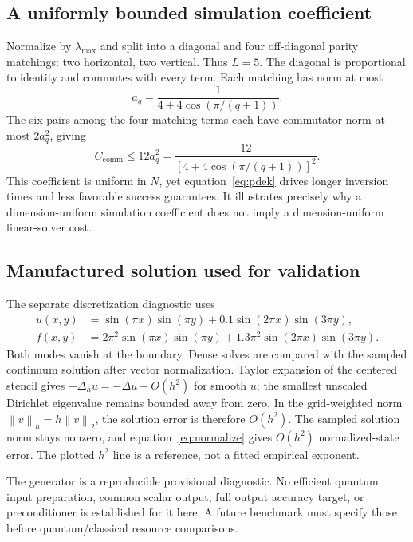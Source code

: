 \documentclass[11pt,a4paper]{article}
\newcommand{\norm}[1]{\left\lVert #1\right\rVert}
\newcommand{\C}{C_{\mathrm{comm}}}
\begin{document}
\subsection{A uniformly bounded simulation coefficient}
Normalize by $\lambda_{\max}$ and split into a diagonal and four off-diagonal parity matchings: two horizontal, two vertical. Thus $L=5$. The diagonal is proportional to identity and commutes with every term. Each matching has norm at most
\begin{equation}
 a_q=\frac{1}{4+4\cos(\pi/(q+1))}.
\end{equation}
The six pairs among the four matching terms each have commutator norm at most $2a_q^2$, giving
\begin{equation}
 \C\leq12a_q^2=\frac{12}{[4+4\cos(\pi/(q+1))]^2}.
\end{equation}
This coefficient is uniform in $N$, yet equation~\eqref{eq:pdek} drives longer inversion times and less favorable success guarantees. It illustrates precisely why a dimension-uniform simulation coefficient does not imply a dimension-uniform linear-solver cost.

\subsection{Manufactured solution used for validation}
The separate discretization diagnostic uses
\begin{align}
 u(x,y)&=\sin(\pi x)\sin(\pi y)+0.1\sin(2\pi x)\sin(3\pi y),\\
 f(x,y)&=2\pi^2\sin(\pi x)\sin(\pi y)
 +1.3\pi^2\sin(2\pi x)\sin(3\pi y).
\end{align}
Both modes vanish at the boundary. Dense solves are compared with the sampled continuum solution after vector normalization. Taylor expansion of the centered stencil gives $-\Delta_hu=-\Delta u+O(h^2)$ for smooth $u$; the smallest unscaled Dirichlet eigenvalue remains bounded away from zero. In the grid-weighted norm $\norm v_h=h\norm v_2$, the solution error is therefore $O(h^2)$. The sampled solution norm stays nonzero, and equation~\eqref{eq:normalize} gives $O(h^2)$ normalized-state error. The plotted $h^2$ line is a reference, not a fitted empirical exponent.

The generator is a reproducible provisional diagnostic. No efficient quantum input preparation, common scalar output, full output accuracy target, or preconditioner is established for it here. A future benchmark must specify those before quantum/classical resource comparisons.
\end{document}
